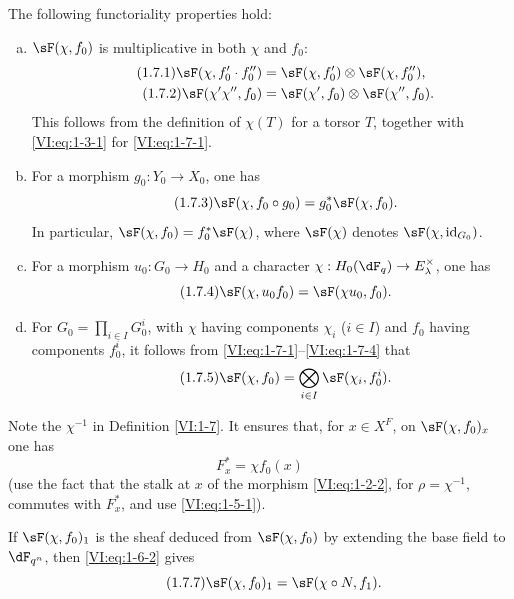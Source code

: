 \documentclass[12pt,oneside,english]{smfbook}
\newcounter{char}
\begin{document}
The following functoriality properties hold:
\begin{enumerate}[a)]
  \item $\sF(\chi,f_0)$ is multiplicative in both $\chi$ and $f_0$:
    \begin{align*}\tag{1.7.1}\label{VI:eq:1-7-1}
      \sF(\chi,f_0'\cdot f_0'') &= \sF(\chi,f_0')\otimes \sF(\chi,f_0'') \text{,} \\
      \tag{1.7.2}\label{VI:eq:1-7-2}
      \sF(\chi'\chi'',f_0) &= \sF(\chi',f_0)\otimes \sF(\chi'',f_0) \text{.}
    \end{align*}
    This follows from the definition of $\chi(T)$ for a torsor $T$, together with \eqref{VI:eq:1-3-1} for \eqref{VI:eq:1-7-1}.
  \item For a morphism $g_0:Y_0\to X_0$, one has
    \begin{equation*}\tag{1.7.3}\label{VI:eq:1-7-3}
      \sF(\chi,f_0\circ g_0) = g_0^\ast \sF(\chi,f_0) \text{.}
    \end{equation*}
    In particular, $\sF(\chi,f_0)=f_0^\ast\sF(\chi)$, where $\sF(\chi)$ denotes $\sF(\chi,\operatorname{id}_{G_0})$.
  \item For a morphism $u_0:G_0\to H_0$ and a character $\chi:H_0(\dF_q)\to E_\lambda^\times$, one has
    \begin{equation*}\tag{1.7.4}\label{VI:eq:1-7-4}
      \sF(\chi,u_0 f_0) = \sF(\chi u_0,f_0) \text{.}
    \end{equation*}
  \item For $G_0=\prod_{i\in I}G_0^i$, with $\chi$ having components $\chi_i$ ($i\in I$) and $f_0$ having components $f_0^i$, it follows from \eqref{VI:eq:1-7-1}--\eqref{VI:eq:1-7-4} that
    \begin{equation*}\tag{1.7.5}\label{VI:eq:1-7-5}
      \sF(\chi,f_0) = \bigotimes_{i\in I} \sF(\chi_i,f_0^i) \text{.}
    \end{equation*}
\end{enumerate}

Note the $\chi^{-1}$ in Definition \ref{VI:1-7}. It ensures that, for $x\in X^F$, on $\sF(\chi,f_0)_x$ one has
\begin{equation*}\tag{1.7.6}\label{VI:eq:1-7-6}
  F_x^\ast = \chi f_0(x)
\end{equation*}
(use the fact that the stalk at $x$ of the morphism \eqref{VI:eq:1-2-2}, for $\rho=\chi^{-1}$, commutes with $F_x^\ast$, and use \eqref{VI:eq:1-5-1}).

If $\sF(\chi,f_0)_1$ is the sheaf deduced from $\sF(\chi,f_0)$ by extending the base field to $\dF_{q^n}$, then \eqref{VI:eq:1-6-2} gives
\begin{equation*}\tag{1.7.7}\label{VI:eq:1-7-7}
  \sF(\chi,f_0)_1 = \sF(\chi\circ N,f_1) \text{.}
\end{equation*}
\end{document}
